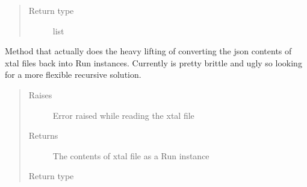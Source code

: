 \documentclass[letterpaper,10pt,english]{sphinxmanual}
\begin{document}
\begin{fulllineitems}
\begin{fulllineitems}
\begin{quote}
\begin{description}
\item[{Return type}] \leavevmode
list

\end{description}\end{quote}

\end{fulllineitems}


\begin{fulllineitems}
\label{\detokenize{polo.utils:polo.utils.io_utils.RunDeserializer.xtal_to_run}}
Method that actually does the heavy lifting of converting the json
contents of xtal files back into Run instances. Currently is pretty
brittle and ugly so looking for a more flexible recursive solution.
\begin{quote}\begin{description}
\item[{Raises}] \leavevmode
{} \textendash{} Error raised while reading the xtal file

\item[{Returns}] \leavevmode
The contents of xtal file as a Run instance

\item[{Return type}] \leavevmode
{\hyperref[\detokenize{polo.crystallography:polo.crystallography.run.Run}]{}}

\end{description}\end{quote}

\end{fulllineitems}


\end{fulllineitems}

\end{document}
